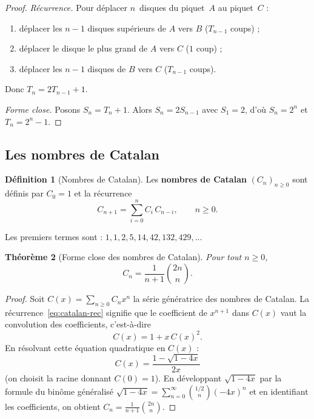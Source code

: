 \documentclass[12pt,a4paper,openany]{book}
\theoremstyle{definition}
\newtheorem{definition}{Définition}[chapter]
\theoremstyle{plain}
\newtheorem{theoreme}[definition]{Théorème}
\theoremstyle{remark}
\begin{document}
\begin{proof}
\emph{Récurrence.} Pour déplacer $n$~disques du piquet~$A$ au piquet~$C$ :
\begin{enumerate}[label=(\roman*)]
  \item déplacer les $n-1$ disques supérieurs de $A$ vers $B$ ($T_{n-1}$ coups) ;
  \item déplacer le disque le plus grand de $A$ vers $C$ ($1$ coup) ;
  \item déplacer les $n-1$ disques de $B$ vers $C$ ($T_{n-1}$ coups).
\end{enumerate}
Donc $T_n = 2T_{n-1} + 1$.

\emph{Forme close.} Posons $S_n = T_n + 1$. Alors $S_n = 2S_{n-1}$ avec
$S_1 = 2$, d'où $S_n = 2^n$ et $T_n = 2^n - 1$.
\end{proof}

\subsection{Les nombres de Catalan}
\label{subsec:catalan}

\begin{definition}[Nombres de Catalan]
\label{def:catalan}
Les \textbf{nombres de Catalan} $(C_n)_{n \geq 0}$ sont définis par
$C_0 = 1$ et la récurrence
\begin{equation}
\label{eq:catalan-rec}
  C_{n+1} = \sum_{i=0}^{n} C_i\, C_{n-i}, \qquad n \geq 0.
\end{equation}
\end{definition}

Les premiers termes sont : $1, 1, 2, 5, 14, 42, 132, 429, \ldots$

\begin{theoreme}[Forme close des nombres de Catalan]
\label{thm:catalan-close}
Pour tout $n \geq 0$,
\[
  C_n = \frac{1}{n+1}\binom{2n}{n}.
\]
\end{theoreme}

\begin{proof}
Soit $C(x) = \sum_{n \geq 0} C_n x^n$ la série génératrice des nombres de Catalan.
La récurrence~\eqref{eq:catalan-rec} signifie que le coefficient de $x^{n+1}$
dans $C(x)$ vaut la convolution des coefficients, c'est-à-dire
\[
  C(x) = 1 + x\, C(x)^2.
\]
En résolvant cette équation quadratique en $C(x)$ :
\[
  C(x) = \frac{1 - \sqrt{1 - 4x}}{2x}
\]
(on choisit la racine donnant $C(0) = 1$). En développant $\sqrt{1-4x}$ par la
formule du binôme généralisé
$\sqrt{1 - 4x} = \sum_{n=0}^{\infty} \binom{1/2}{n}(-4x)^n$
et en identifiant les coefficients, on obtient $C_n = \frac{1}{n+1}\binom{2n}{n}$.
\end{proof}
\end{document}
